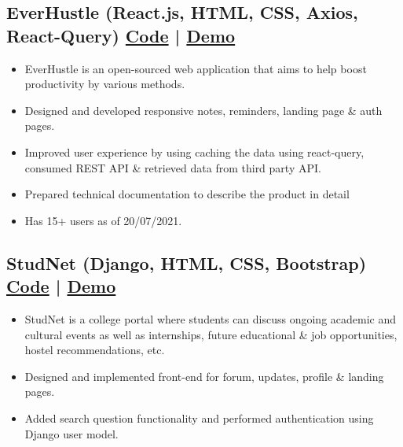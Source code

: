 \documentclass[a4,10pt]{article}
\newenvironment{zitemize}{
\begin{itemize}\itemsep0pt \parskip0pt \parsep1pt}
{\end{itemize}\vspace{-0.5cm}}
\begin{document}
\subsection*{EverHustle {\normalsize\normalfont (React.js, HTML, CSS, Axios, React-Query)} \hfill {\href{https://github.com/DevelopersLeague/EverHustle-FrontEnd}{Code} } | {\href{https://everhustle.netlify.app/}{Demo} }} 
    \begin{zitemize}
        \item EverHustle is an open-sourced web application that aims to help boost productivity by various methods. 
        \item Designed and developed responsive notes, reminders, landing page \& auth pages.
        \item Improved user experience by using caching the data using react-query, consumed REST API \& retrieved data
        from third party API.
        \item Prepared technical documentation to describe the product in detail
        \item Has 15+ users as of 20/07/2021.
    \end{zitemize}


\subsection*{StudNet {\normalsize\normalfont (Django, HTML, CSS, Bootstrap)} \hfill {\href{https://github.com/DevelopersLeague/StudNet}{Code} } | {\href{https://stud-net.herokuapp.com/}{Demo} }} 
    \begin{zitemize}
        \item StudNet is a college portal where students can discuss ongoing academic and cultural events as well as 
        internships, future educational \& job opportunities, hostel recommendations, etc. 
        \item Designed and implemented front-end for forum, updates, profile \& landing pages.
        \item Added search question functionality and performed authentication using Django user model.
    \end{zitemize}




\end{document}
